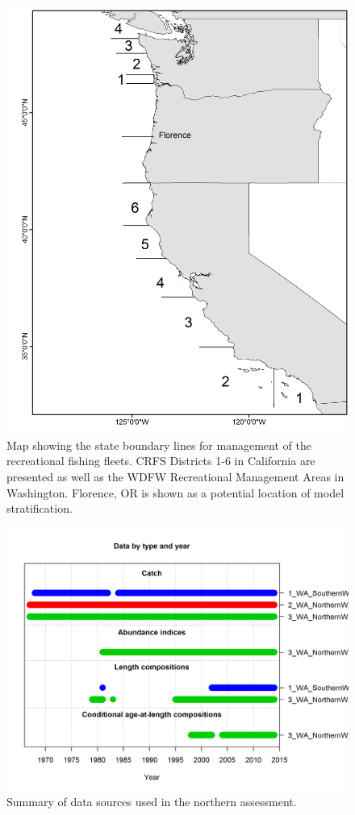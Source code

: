 \documentclass[12pt,]{article}
\begin{document}
\begin{figure}[htbp]
\centering
\includegraphics{Figures/boundary_map.png}
\caption{Map showing the state boundary lines for management of the
recreational fishing fleets. CRFS Districts 1-6 in California are
presented as well as the WDFW Recreational Management Areas in
Washington. Florence, OR is shown as a potential location of model
stratification. \label{fig:boundary_map}}
\end{figure}

\begin{figure}[htbp]
\centering
\includegraphics{r4ss/plots_mod1/data_plot.png}
\caption{Summary of data sources used in the northern assessment.
\label{fig:data_plot}}
\end{figure}
\end{document}
